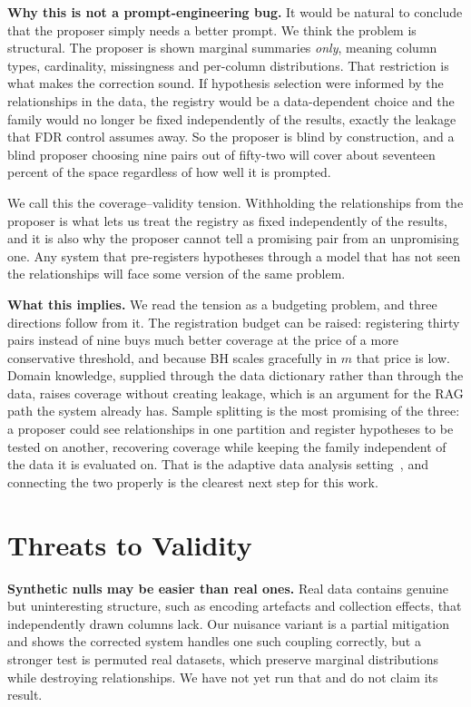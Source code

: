 \documentclass[10pt,twocolumn]{article}
\newcommand{\phead}[1]{\smallskip\noindent\textbf{#1.}\hspace{0.6em}\ignorespaces}
\begin{document}
\phead{Why this is not a prompt-engineering bug} It would be natural to
conclude that the proposer simply needs a better prompt. We think the problem is
structural. The proposer is shown marginal summaries \emph{only}, meaning column
types, cardinality, missingness and per-column distributions. That restriction
is what makes the correction sound. If hypothesis selection were
informed by the relationships in the data, the registry would be a
data-dependent choice and the family would no longer be fixed independently of
the results, exactly the leakage that FDR control assumes away. So the proposer
is blind by construction, and a blind proposer choosing nine pairs out of
fifty-two will cover about seventeen percent of the space regardless of how
well it is prompted.

We call this the coverage--validity tension. Withholding the relationships from
the proposer is what lets us treat the registry as fixed independently of the
results, and it is also why the proposer cannot tell a promising pair from an
unpromising one. Any system that pre-registers hypotheses through a model that
has not seen the relationships will face some version of the same problem.

\phead{What this implies} We read the tension as a budgeting problem, and
three directions follow from it. The registration budget can be raised:
registering thirty pairs instead of nine buys much better coverage at the price
of a more conservative threshold, and because BH scales gracefully in $m$ that
price is low. Domain knowledge, supplied
through the data dictionary rather than through the data, raises coverage
without creating leakage, which is an argument for the RAG path the system
already has. Sample splitting is the most promising of the three: a proposer could see
relationships in one partition and register hypotheses to be tested on another,
recovering coverage while keeping the family independent of the data it is
evaluated on. That is the adaptive data analysis setting~\cite{dwork2015}, and
connecting the two properly is the clearest next step for this work.

\section{Threats to Validity}
\label{sec:threats}

\phead{Synthetic nulls may be easier than real ones} Real data contains
genuine but uninteresting structure, such as encoding artefacts and collection
effects, that independently drawn columns lack. Our nuisance variant is a
partial mitigation and shows the corrected system handles one such coupling
correctly, but a stronger test is permuted real datasets, which preserve
marginal distributions while destroying relationships. We have not yet run that
and do not claim its result.
\end{document}
